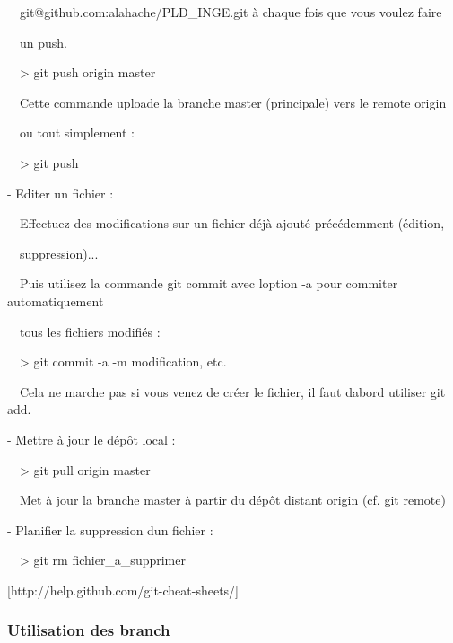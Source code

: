 \documentclass{mise_en_page}
\begin{document}
\ \ {\textquotedbl}git@github.com:alahache/PLD\_INGE.git{\textquotedbl}
à chaque fois que vous voulez faire

\ \ un push.




\ \ {\textgreater} git push origin master

\ \ Cette commande uploade la branche
{\textquotedbl}master{\textquotedbl} (principale) vers le remote
{\textquotedbl}origin{\textquotedbl}




\ \ ou tout simplement :

\ \ {\textgreater} git push







{}- Editer un fichier :

\ \ Effectuez des modifications sur un fichier déjà ajouté précédemment
(édition,

\ \ suppression)...

\ \ Puis utilisez la commande git commit avec l{\textquotesingle}option
-a pour commiter automatiquement

\ \ tous les fichiers modifiés :

\ \ {\textgreater} git commit -a -m {\textquotedbl}modification,
etc.{\textquotedbl}




\ \ Cela ne marche pas si vous venez de créer le fichier, il faut
d{\textquotesingle}abord utiliser git add.







{}- Mettre à jour le dépôt local :

\ \ {\textgreater} git pull origin master

\ \ Met à jour la branche master à partir du dépôt distant origin (cf.
git remote)







{}- Planifier la suppression d{\textquotesingle}un fichier :

\ \ {\textgreater} git rm fichier\_a\_supprimer




[http://help.github.com/git-cheat-sheets/]

\subsubsection{Utilisation des branch}
\end{document}
